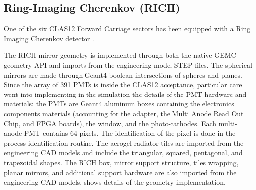 \subsection{Ring-Imaging Cherenkov (RICH)}

One of the six CLAS12 Forward Carriage sectors has been equipped with a Ring Imaging Cherenkov detector \cite{rich-nim}.

The RICH mirror geometry is implemented through both the native GEMC geometry API and imports from the engineering
model STEP files. The spherical mirrors are made through Geant4 boolean intersections of spheres and planes.
Since the array of 391 PMTs is inside the CLAS12 acceptance, particular care went into implementing in the
simulation the details of the PMT hardware and materials: the PMTs are Geant4 aluminum boxes containing the
electronics components materials (accounting for the adapter, the  Multi Anode Read Out Chip, and FPGA boards),
the window, and the photo-cathodes.
Each multi-anode PMT contains 64 pixels. The identification of the pixel is done in the process identification routine.
The aerogel radiator tiles are imported from the engineering CAD models and include the triangular, squared, pentagonal,
and trapezoidal shapes. The RICH box, mirror support structure, tiles wrapping, planar mirrors, and additional
support hardware are also imported from the engineering CAD models.
 shows details of the geometry implementation.

